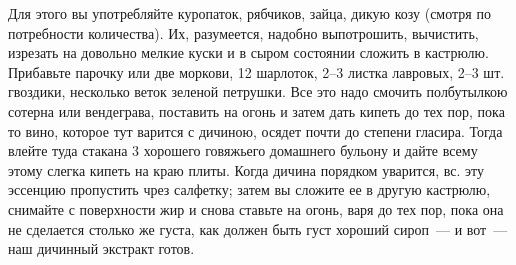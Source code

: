 \begin{enumerate}
Для этого вы употребляйте куропаток, рябчиков, зайца, дикую козу (смотря по потребности количества). Их, разумеется, надобно выпотрошить, вычистить, изрезать на довольно мелкие куски и в сыром состоянии сложить в кастрюлю. Прибавьте парочку или две моркови, 12 шарлоток, 2--3 листка лавровых, 2--3 шт. гвоздики, несколько веток зеленой петрушки. Все это надо смочить полбутылкою сотерна или вендеграва, поставить на огонь и затем дать кипеть до тех пор, пока то вино, которое тут варится с дичиною, осядет почти до степени гласира. Тогда влейте туда стакана 3 хорошего говяжьего домашнего бульону и дайте всему этому слегка кипеть на краю плиты. Когда дичина порядком уварится, вс. эту эссенцию пропустить чрез салфетку; затем вы сложите ее в другую кастрюлю, снимайте с поверхности жир и снова ставьте на огонь, варя до тех пор, пока она не сделается столько же густа, как должен быть густ хороший сироп~--- и вот~--- наш дичинный экстракт готов.
\end{enumerate}
